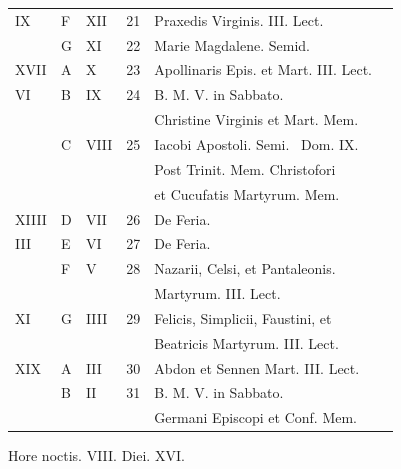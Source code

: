\begin{center}
\begin{tabular}{l | l | l | r | l l}
\color{Red} IX & F & \color{Red} XII & 21 & Praxedis Virginis. III. Lect. & \color{Red} \\
\color{Red}  & G & \color{Red} XI & 22 & \color{Red} Marie Magdalene. Semid. \\
\color{Red} XVII & \color{Red} A & \color{Red} X & 23 & \color{Red} Apollinaris Epis. et Mart. III. Lect. \\
\color{Red} VI & B & \color{Red} IX & 24 & B. M. V. in Sabbato. \\
 &  &  &  & \quad Christine Virginis et Mart. Mem. \\
\color{Red}  & C & \color{Red} VIII & 25 & \multicolumn{2}{l}{Iacobi Apostoli. Semi. \ Dom. IX. } \\
 &  &  &  & \quad Post Trinit. Mem. Christofori \\
 &  &  &  & \quad et Cucufatis Martyrum. Mem. \\
\color{Red} XIIII & D & \color{Red} VII & 26 & De Feria. & \color{Red} \\
\color{Red} III & E & \color{Red} VI & 27 & De Feria. & \color{Red} \\
\color{Red}  & F & \color{Red} V & 28 & \multicolumn{2}{l}{Nazarii, Celsi, et Pantaleonis.} \\
 &  &  &  & \quad Martyrum. III. Lect. \color{Red} \\
\color{Red} XI & G & \color{Red} IIII & 29 & \multicolumn{2}{l}{\color{Red} Felicis, Simplicii, Faustini, et} \\
 &  &  &  & \quad \color{Red} Beatricis Martyrum. III. Lect. \\
\color{Red} XIX & \color{Red} A & \color{Red} III & 30 & Abdon et Sennen Mart. III. Lect. & \color{Red} \\
\color{Red}  & B & \color{Red} II & 31 & B. M. V. in Sabbato. \\
 &  &  &  & \quad Germani Episcopi et Conf. Mem. & \color{Red} \\
\end{tabular}
\newline \color{Red} Hore noctis. VIII. Diei. XVI.
\end{center}



\newpage
\color{Red}\color{black}

